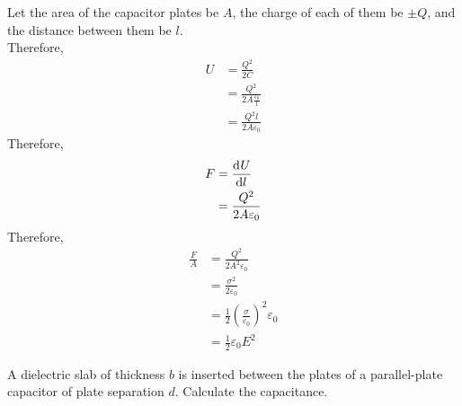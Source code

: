 \documentclass[fleqn, a4paper, 11pt, oneside]{amsart}
\theoremstyle{definition}
\theoremstyle{theorem}
\begin{document}
\begin{solution}
	Let the area of the capacitor plates be $A$, the charge of each of them be $\pm Q$, and the distance between them be $l$.\\
	Therefore,
	\begin{align*}
		U &= \frac{Q^2}{2 C}\\
		&= \frac{Q^2}{2 A \frac{\varepsilon_0}{l}}\\
		&= \frac{Q^2 l}{2 A \varepsilon_0}
	\end{align*}
	Therefore,
	\begin{align*}
		F &= \dod{U}{l}\\
		&= \frac{Q^2}{2 A \varepsilon_0}
	\end{align*}
	Therefore,
	\begin{align*}
		\frac{F}{A} &= \frac{Q^2}{2 A^2 \varepsilon_0}\\
		&= \frac{\sigma^2}{2 \varepsilon_0}\\
		&= \frac{1}{2} \left( \frac{\sigma}{\varepsilon_0} \right)^2 \varepsilon_0\\
		&= \frac{1}{2} \varepsilon_0 E^2
	\end{align*}
\end{solution}

\begin{question}
	A dielectric slab of thickness $b$ is inserted between the plates of a parallel-plate capacitor of plate separation $d$.
	Calculate the capacitance.
\end{question}
\end{document}
